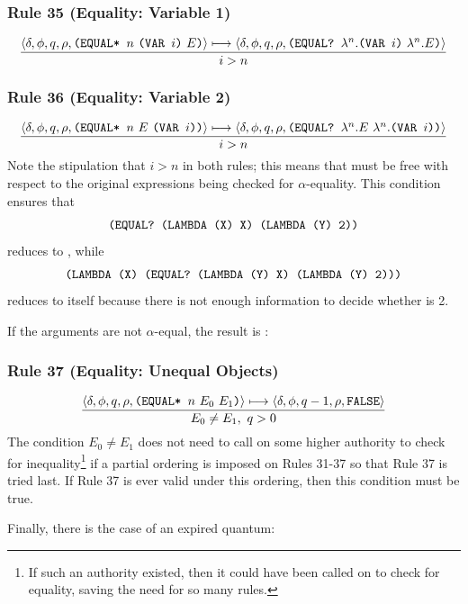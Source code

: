 \subsubsection*{Rule 35 (Equality: Variable 1)}
\[
\frac{\langle \delta,\phi,q,\rho,\texttt{(EQUAL* }n\ \texttt{(VAR }i\texttt{)}\ E\texttt{)}\rangle\longmapsto
      \langle \delta,\phi,q,\rho,\texttt{(EQUAL? }\lambda^n.\texttt{(VAR }i\texttt{)}\ \lambda^n.E\texttt{)}\rangle}
     {i>n}
\]

\subsubsection*{Rule 36 (Equality: Variable 2)}
\[
\frac{\cfg{\delta}{\phi}{q}{\rho}{\THOR{(EQUAL* }n\ E\ \THOR{(VAR }i\THOR{)}\THOR{)}}\redsto
      \cfg{\delta}{\phi}{q}{\rho}{\THOR{(EQUAL? }\lambda^n.E\ \lambda^n.\THOR{(VAR }i\THOR{)}\THOR{)}}}
     {i>n}
\]
Note the stipulation that \(i>n\) in both rules; this means that 
must be free with respect to the original expressions being checked for
\(\alpha\)-equality. This condition ensures that
\[
\texttt{(EQUAL? (LAMBDA (X) X) (LAMBDA (Y) 2))}
\]
reduces to , while
\[
\texttt{(LAMBDA (X) (EQUAL? (LAMBDA (Y) X) (LAMBDA (Y) 2)))}
\]
reduces to itself because there is not enough information to decide whether
 is 2.

If the arguments are not \(\alpha\)-equal, the result is :

\subsubsection*{Rule 37 (Equality: Unequal Objects)}
\[
\frac{\langle \delta,\phi,q,\rho,\texttt{(EQUAL* }n\ E_0\ E_1\texttt{)}\rangle\longmapsto
      \langle \delta,\phi,q-1,\rho,\texttt{FALSE}\rangle}
     {E_0\ne E_1,\ q>0}
\]
The condition \(E_0\ne E_1\) does not need to call on some higher authority to
check for inequality\footnote{If such an authority existed, then it could have
been called on to check for equality, saving the need for so many rules.} if a
partial ordering is imposed on Rules 31-37 so that Rule 37 is tried last. If
Rule 37 is ever valid under this ordering, then this condition must be true.

Finally, there is the case of an expired quantum:

